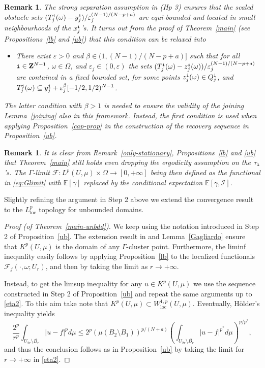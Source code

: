 \documentclass[10pt,reqno]{amsart}
\numberwithin{equation}{section}
\def\Z{{\bf Z}}
\def\eps{{\varepsilon}_j}
\def\ii{{\tt i}}
\def\e{\varepsilon}
\def\KpmuU{K^p(U,\mu)}
\def\Om{\Omega}
\def\om{\omega}
\def\Qij{Q_j^\ii}
\def\Teio{T_{j}^\ii(\om)}
\def\xijo{y_j^{\ii}}
\def\FFjpsi{{\mathcal F}_j}
\def\FFpsi{{\mathcal F}}
\newtheorem{remark}[theorem]{Remark}
\begin{document}
\begin{remark}\label{hptre}
The strong separation assumption in (Hp 3) ensures that the scaled 
obstacle sets  $(\Teio-\xijo)/\eps^{(N-1)/(N-p+a)}$ are equi-bounded and 
located in small neighbourhoods of the $x^{\ii}_j$'s.
It turns out from the proof of Theorem~\ref{main}
(see Propositions~\ref{lb} and \ref{ub}) that 
this condition can be relaxed into
\begin{itemize}

\item[{\bf (Hp 3)}$^\prime$] There exist $\e>0$ and
$\beta\in(1,(N-1)/(N-p+a)]$ such that
for all $\ii\in\Z^{N-1}$, $\om\in\Om$, and $\eps\in(0,\e)$
the sets $(\Teio-z^\ii_j(\om))/\eps^{(N-1)/(N-p+a)}$ are contained in
a fixed bounded set, for some points $z^\ii_j(\om)\in\Qij$, and
$\Teio\subseteq\xijo+\eps^\beta[-1/2,1/2)^{N-1}$.
\end{itemize}
The latter condition with $\beta>1$ is needed to ensure the validity
of the joining Lemma~\ref{joining} also in this framework.
Instead, the first condition is used when applying
Proposition~\ref{cap-prop} in the construction of the
recovery sequence in Proposition~\ref{ub}.
\end{remark}
\begin{remark}
It is clear from Remark~\ref{only-stationary}, Propositions~\ref{lb} and 
\ref{ub} that Theorem~\ref{main} still holds even dropping the ergodicity 
assumption on the $\tau_\ii$'s. The $\Gamma$-limit 
$\FFpsi:L^p(U,\mu)\times\Om\to[0,+\infty]$ being then defined as  
the functional in \eqref{eq:Glimit} with $\mathbb{E}[\gamma]$ 
replaced by the conditional expectation $\mathbb{E}[\gamma,\mathscr{I}]$.
\end{remark}
Slightly refining the argument in Step 2 above we extend the convergence 
result to the $L^p_{\mathrm{loc}}$ topology for unbounded domains.
\begin{proof}[Proof (of Theorem~\ref{main-unbdd})]
We keep using the notation introduced in Step 2 of Proposition~\ref{ub}.
The extension result in \cite[Theorem 1.1]{Chua} and Lemma~\ref{Gagliardo}
ensure that $\KpmuU$ is the domain of any $\Gamma$-cluster point.
Furthermore, the liminf inequality easily follows 
by applying Proposition~\ref{lb} to the localized functionals
$\FFjpsi(\cdot,\om;U_r)$, and then by taking the limit as $r\to+\infty$.

Instead, to get the limsup inequality for any $u\in\KpmuU$ we use
the sequence constructed in Step 2 of Proposition~\ref{ub} and 
repeat the same arguments up to \eqref{eta2}. To this aim take 
note that $\KpmuU\subset W^{1,p}_{\mathrm{loc}}(U,\mu)$.
Eventually, H\"older's inequality yields
$$
\frac{2^p}{r^p}\int_{U_{2r}\setminus \overline{B_r}}|u-f|^pd\mu\leq
2^p(\mu(B_2\setminus B_1))^{p/(N+a)}\left(
\int_{U_{2r}\setminus \overline{B_r}}|u-f|^{p^\ast}d\mu\right)^{p/p^\ast},
$$
and thus the conclusion follows as in Proposition~\ref{ub} by taking 
the limit for $r\to+\infty$ in \eqref{eta2}. 
\end{proof}
\end{document}
